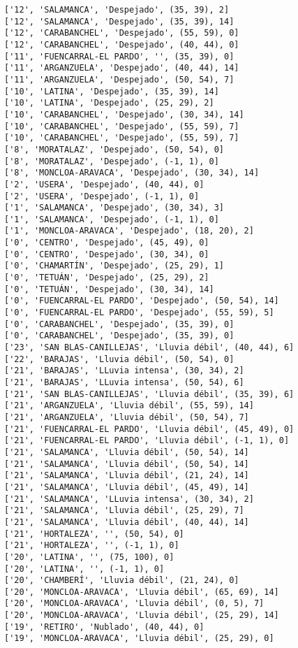 \documentclass[11pt]{article}
\begin{document}
\begin{Verbatim}[commandchars=\\\{\}]
['12', 'SALAMANCA', 'Despejado', (35, 39), 2]
['12', 'SALAMANCA', 'Despejado', (35, 39), 14]
['12', 'CARABANCHEL', 'Despejado', (55, 59), 0]
['12', 'CARABANCHEL', 'Despejado', (40, 44), 0]
['11', 'FUENCARRAL-EL PARDO', '', (35, 39), 0]
['11', 'ARGANZUELA', 'Despejado', (40, 44), 14]
['11', 'ARGANZUELA', 'Despejado', (50, 54), 7]
['10', 'LATINA', 'Despejado', (35, 39), 14]
['10', 'LATINA', 'Despejado', (25, 29), 2]
['10', 'CARABANCHEL', 'Despejado', (30, 34), 14]
['10', 'CARABANCHEL', 'Despejado', (55, 59), 7]
['10', 'CARABANCHEL', 'Despejado', (55, 59), 7]
['8', 'MORATALAZ', 'Despejado', (50, 54), 0]
['8', 'MORATALAZ', 'Despejado', (-1, 1), 0]
['8', 'MONCLOA-ARAVACA', 'Despejado', (30, 34), 14]
['2', 'USERA', 'Despejado', (40, 44), 0]
['2', 'USERA', 'Despejado', (-1, 1), 0]
['1', 'SALAMANCA', 'Despejado', (30, 34), 3]
['1', 'SALAMANCA', 'Despejado', (-1, 1), 0]
['1', 'MONCLOA-ARAVACA', 'Despejado', (18, 20), 2]
['0', 'CENTRO', 'Despejado', (45, 49), 0]
['0', 'CENTRO', 'Despejado', (30, 34), 0]
['0', 'CHAMARTÍN', 'Despejado', (25, 29), 1]
['0', 'TETUÁN', 'Despejado', (25, 29), 2]
['0', 'TETUÁN', 'Despejado', (30, 34), 14]
['0', 'FUENCARRAL-EL PARDO', 'Despejado', (50, 54), 14]
['0', 'FUENCARRAL-EL PARDO', 'Despejado', (55, 59), 5]
['0', 'CARABANCHEL', 'Despejado', (35, 39), 0]
['0', 'CARABANCHEL', 'Despejado', (35, 39), 0]
['23', 'SAN BLAS-CANILLEJAS', 'Lluvia débil', (40, 44), 6]
['22', 'BARAJAS', 'Lluvia débil', (50, 54), 0]
['21', 'BARAJAS', 'LLuvia intensa', (30, 34), 2]
['21', 'BARAJAS', 'LLuvia intensa', (50, 54), 6]
['21', 'SAN BLAS-CANILLEJAS', 'Lluvia débil', (35, 39), 6]
['21', 'ARGANZUELA', 'Lluvia débil', (55, 59), 14]
['21', 'ARGANZUELA', 'Lluvia débil', (50, 54), 7]
['21', 'FUENCARRAL-EL PARDO', 'Lluvia débil', (45, 49), 0]
['21', 'FUENCARRAL-EL PARDO', 'Lluvia débil', (-1, 1), 0]
['21', 'SALAMANCA', 'Lluvia débil', (50, 54), 14]
['21', 'SALAMANCA', 'Lluvia débil', (50, 54), 14]
['21', 'SALAMANCA', 'Lluvia débil', (21, 24), 14]
['21', 'SALAMANCA', 'Lluvia débil', (45, 49), 14]
['21', 'SALAMANCA', 'LLuvia intensa', (30, 34), 2]
['21', 'SALAMANCA', 'Lluvia débil', (25, 29), 7]
['21', 'SALAMANCA', 'Lluvia débil', (40, 44), 14]
['21', 'HORTALEZA', '', (50, 54), 0]
['21', 'HORTALEZA', '', (-1, 1), 0]
['20', 'LATINA', '', (75, 100), 0]
['20', 'LATINA', '', (-1, 1), 0]
['20', 'CHAMBERÍ', 'Lluvia débil', (21, 24), 0]
['20', 'MONCLOA-ARAVACA', 'Lluvia débil', (65, 69), 14]
['20', 'MONCLOA-ARAVACA', 'Lluvia débil', (0, 5), 7]
['20', 'MONCLOA-ARAVACA', 'Lluvia débil', (25, 29), 14]
['19', 'RETIRO', 'Nublado', (40, 44), 0]
['19', 'MONCLOA-ARAVACA', 'Lluvia débil', (25, 29), 0]

\end{Verbatim}
\end{document}
